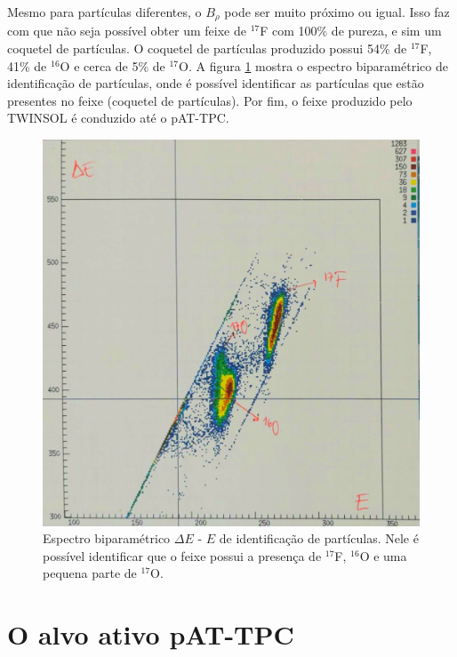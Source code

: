 \documentclass[a4paper,12pt,oneside]{book}
\begin{document}
\par Mesmo para partículas diferentes, o $B_{\rho}$ pode ser muito próximo ou igual. Isso faz com que não seja possível obter um feixe de $^{17}$F com 100\% de pureza, e sim um coquetel de partículas\cite{zamora_mater}. O coquetel de partículas produzido possui 54\% de $^{17}$F, 41\% de $^{16}$O e cerca de 5\% de $^{17}$O. A figura \ref{fig:PID_17F} mostra o espectro biparamétrico de identificação de partículas, onde é possível identificar as partículas que estão presentes no feixe (coquetel de partículas). Por fim, o feixe  produzido pelo TWINSOL é conduzido até o pAT-TPC.

\begin{figure}[H]
    \centering
    \includegraphics[scale = 0.12]{figs/pid_17F.png}
    \caption{Espectro biparamétrico $\Delta E$ - $E$ de identificação de partículas. Nele é possível identificar que o feixe possui a presença de $^{17}$F, $^{16}$O e uma pequena parte de $^{17}$O.}
    \label{fig:PID_17F}
\end{figure}

\section{O alvo ativo pAT-TPC}
\end{document}
